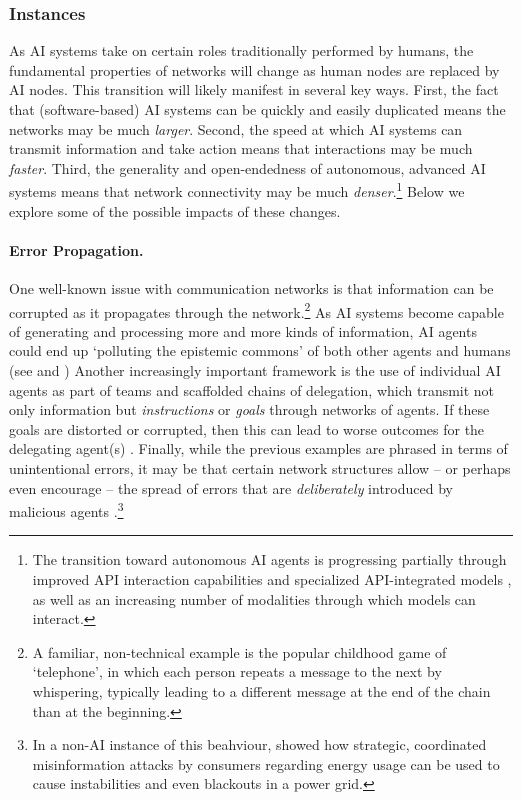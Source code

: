 \subsubsection{Instances}

As AI systems take on certain roles traditionally performed by humans, the fundamental properties of networks will change as human nodes are replaced by AI nodes. This transition will likely manifest in several key ways.
First, the fact that (software-based) AI systems can be quickly and easily duplicated means the networks may be much \emph{larger}.
Second, the speed at which AI systems can transmit information and take action means that interactions may be much \emph{faster}.
Third, the generality and open-endedness of autonomous, advanced AI systems means that network connectivity may be much \emph{denser}.\footnote{The transition toward autonomous AI agents is progressing partially through improved API interaction capabilities \citep{mialon2023augmented,Qin2023ToolLLMFL} and specialized API-integrated models \citep{Basu2024APIBLENDAC,Patil2023GorillaLL,Anthropic2024}, as well as an increasing number of modalities through which models can interact.}
Below we explore some of the possible impacts of these changes.

\paragraph{Error Propagation.}
One well-known issue with communication networks is that {information can be corrupted} as it propagates through the network.\footnote{A familiar, non-technical example is the popular childhood game of `telephone', in which each person repeats a message to the next by whispering, typically leading to a different message at the end of the chain than at the beginning.}
As AI systems become capable of generating and processing more and more kinds of information, AI agents could end up `polluting the epistemic commons' \citep{Huang2023,Kay2024} of both other agents \citep{Ju2024} and humans (see  and )
Another increasingly important framework is the use of individual AI agents as part of teams and scaffolded chains of delegation, which transmit not only information but \emph{instructions} or \emph{goals} through networks of agents. 
If these goals are distorted or corrupted, then this can lead to worse outcomes for the delegating agent(s) \citep{Sourbut2024,Nguyen2024a}.
Finally, while the previous examples are phrased in terms of unintentional errors, it may be that certain network structures allow -- or perhaps even encourage -- the spread of errors that are \textit{deliberately} introduced by malicious agents \citep[see also ]{Gu2024,Lee2024,Ju2024}.\footnote{In a non-AI instance of this beahviour, \citet{Raman2019} showed how strategic, coordinated misinformation attacks by consumers regarding energy usage can be used to cause instabilities and even blackouts in a power grid.}

